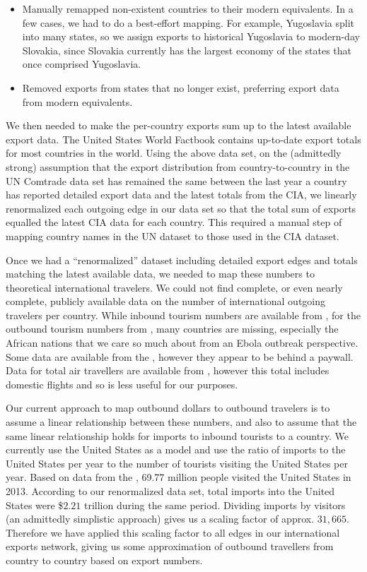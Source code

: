 \documentclass[10pt, journal,onecolumn]{IEEEtran}
\begin{document}
\begin{itemize}
\item Manually remapped non-existent countries to their modern equivalents.
      In a few cases, we had to do a best-effort mapping. For example, Yugoslavia split into many
      states, so we assign exports to historical Yugoslavia to modern-day Slovakia,
      since Slovakia currently has the largest economy of the states that once comprised Yugoslavia.
\item Removed exports from states that no longer exist, preferring export data from
      modern equivalents.
\end{itemize}

We then needed to make the per-country exports sum up to the latest available export data.
The United States \cite{ciatotalexports} World Factbook contains up-to-date export totals
for most countries in the world. Using the above data set, on the (admittedly strong) assumption
that the export distribution
from country-to-country in the UN Comtrade data set has remained the same between the last year a
country has reported detailed export data and the latest totals from the CIA, we linearly renormalized
each outgoing edge in our data set so that the total sum of exports equalled the latest CIA data
for each country.
This required a manual step of mapping country names in the UN dataset to those used in
the CIA dataset.

Once we had a ``renormalized'' dataset including detailed export edges and totals matching
the latest available data, we needed to map these numbers to theoretical international travelers.
We could not find complete, or even nearly complete, publicly available data on the number of
international outgoing travelers per country. While inbound tourism numbers are available from
\cite{worldbankinboundtourism}, for the outbound tourism numbers from \cite{worldbankoutboundtourism},
many countries are missing,
especially the African nations that we care so much about from an Ebola outbreak perspective.
Some data are available from the \cite{unwtooutboundtourism}, however they appear to be behind a paywall.
Data for total air travellers are available from \cite{worldbankairpassengers},
however this total includes domestic flights and so is less useful for our purposes.

Our current approach to map outbound dollars to outbound travelers is to assume a linear relationship
between these numbers, and also to assume that the same linear relationship holds for imports to
inbound tourists to a country.
We currently use the United States as a model and use the ratio of
imports to the United States per year to the number of tourists visiting the United States per year.
Based on data from the \cite{usinboundtourists}, 69.77 million people visited the United States in 2013.
According to our renormalized data set, total imports into the United States were
\$$2.21$ trillion during the same period. Dividing imports by visitors (an admittedly
simplistic approach) gives us a scaling factor of approx. $31,665$. Therefore we have applied this
scaling factor to all edges in our international exports network, giving us some approximation of
outbound travellers from country to country based on export numbers.
\end{document}
